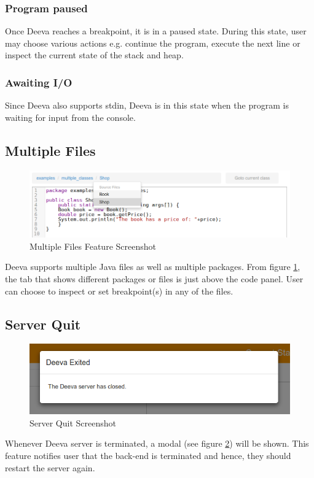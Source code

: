 \documentclass[11pt, a4paper]{article}
\begin{document}
\subsubsection{Program paused}
Once Deeva reaches a breakpoint, it is in a paused state. During this state, user may choose various actions e.g. continue the program, execute the next line or inspect the current state of the stack and heap.
\subsubsection{Awaiting I/O}
Since Deeva also supports stdin, Deeva is in this state when the program is waiting for input from the console.

\subsection{Multiple Files}
\begin{figure}[h!]
\centering
\includegraphics[scale=0.5]{multipleFileFeature.png}
\caption{Multiple Files Feature Screenshot}
\label{fig:multipleFile}
\end{figure}
Deeva supports multiple Java files as well as multiple packages. From figure \ref{fig:multipleFile}, the tab that shows different packages or files is just above the code panel. User can choose to inspect or set breakpoint(s) in any of the files.

\subsection{Server Quit}
\begin{figure}[h!]
\centering
\includegraphics[scale=0.6]{exitFeature.png}
\caption{Server Quit Screenshot}
\label{fig:quitFeature}
\end{figure}
Whenever Deeva server is terminated, a modal (see figure \ref{fig:quitFeature}) will be shown. This feature notifies user that the back-end is terminated and hence, they should restart the server again.
\end{document}
